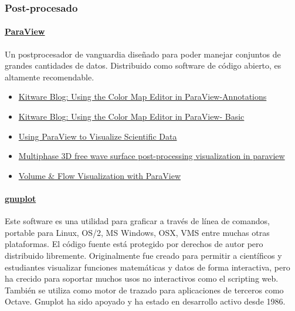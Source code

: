 \subsubsection{Post-procesado}\label{header-n292}

\paragraph{\texorpdfstring{
\href{http://www.paraview.org/}{ParaView}}{ParaView}}\label{header-n294}

Un postprocesador de vanguardia diseñado para poder manejar conjuntos de
grandes cantidades de datos. Distribuido como software de código
abierto, es altamente recomendable.

\begin{itemize}
\item
  \href{http://www.kitware.com/blog/home/post/578}{Kitware Blog: Using
  the Color Map Editor in ParaView-Annotations}
\item
  \href{http://www.kitware.com/blog/home/post/573}{Kitware Blog: Using
  the Color Map Editor in ParaView- Basic}
\item
  \href{www.bu.edu/tech/support/research/training-consulting/online-tutorials/paraview/}{Using
  ParaView to Visualize Scientific Data}
\item
  \href{https://www.cfd-online.com/Forums/openfoam-paraview/106846-multiphase-3d-free-wave-surface-post-processing-visualization-paraview.html}{Multiphase
  3D free wave surface post-processing visualization in paraview}
\item
  \href{http://www.wangbo.info/volume-flow-visualization-with-paraview.html}{Volume
  \& Flow Visualization with ParaView}
\end{itemize}

\paragraph{\texorpdfstring{
\href{http://www.gnuplot.info/}{gnuplot}}{gnuplot}}\label{header-n313}

Este software es una utilidad para graficar a través de línea de
comandos, portable para Linux, OS/2, MS Windows, OSX, VMS entre muchas
otras plataformas. El código fuente está protegido por derechos de autor
pero distribuido libremente. Originalmente fue creado para permitir a
científicos y estudiantes visualizar funciones matemáticas y datos de
forma interactiva, pero ha crecido para soportar muchos usos no
interactivos como el scripting web. También se utiliza como motor de
trazado para aplicaciones de terceros como Octave. Gnuplot ha sido
apoyado y ha estado en desarrollo activo desde 1986.

